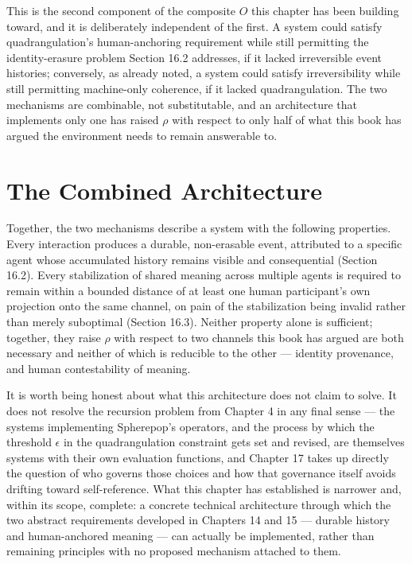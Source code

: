 \documentclass[12pt,a4paper]{book}
\begin{document}
This is the second component of the composite $O$ this chapter has been building toward, and it is deliberately independent of the first. A system could satisfy quadrangulation's human-anchoring requirement while still permitting the identity-erasure problem Section 16.2 addresses, if it lacked irreversible event histories; conversely, as already noted, a system could satisfy irreversibility while still permitting machine-only coherence, if it lacked quadrangulation. The two mechanisms are combinable, not substitutable, and an architecture that implements only one has raised $\rho$ with respect to only half of what this book has argued the environment needs to remain answerable to.

\section{The Combined Architecture}

Together, the two mechanisms describe a system with the following properties. Every interaction produces a durable, non-erasable event, attributed to a specific agent whose accumulated history remains visible and consequential (Section 16.2). Every stabilization of shared meaning across multiple agents is required to remain within a bounded distance of at least one human participant's own projection onto the same channel, on pain of the stabilization being invalid rather than merely suboptimal (Section 16.3). Neither property alone is sufficient; together, they raise $\rho$ with respect to two channels this book has argued are both necessary and neither of which is reducible to the other — identity provenance, and human contestability of meaning.

It is worth being honest about what this architecture does not claim to solve. It does not resolve the recursion problem from Chapter 4 in any final sense — the systems implementing Spherepop's operators, and the process by which the threshold $\epsilon$ in the quadrangulation constraint gets set and revised, are themselves systems with their own evaluation functions, and Chapter 17 takes up directly the question of who governs those choices and how that governance itself avoids drifting toward self-reference. What this chapter has established is narrower and, within its scope, complete: a concrete technical architecture through which the two abstract requirements developed in Chapters 14 and 15 — durable history and human-anchored meaning — can actually be implemented, rather than remaining principles with no proposed mechanism attached to them.
\end{document}
